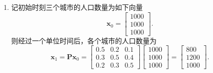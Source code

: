 \begin{solution}
    \begin{enumerate}
        \item 记初始时刻三个城市的人口数量为如下向量
              \[
                  \bm{x}_0 =
                  \begin{bmatrix}
                      1000 \\
                      1000 \\
                      1000
                  \end{bmatrix}.
              \]
              则经过一个单位时间后，各个城市的人口数量为
              \[
                  \bm{x}_1 = \mathbf{P} \bm{x}_0 =
                  \begin{bmatrix}
                      0.5 & 0.2 & 0.1 \\
                      0.3 & 0.5 & 0.4 \\
                      0.2 & 0.3 & 0.5
                  \end{bmatrix}
                  \begin{bmatrix}
                      1000 \\
                      1000 \\
                      1000
                  \end{bmatrix} =
                  \begin{bmatrix}
                      800  \\
                      1200 \\
                      1000
                  \end{bmatrix}.
              \]


\end{enumerate}
\end{solution}
